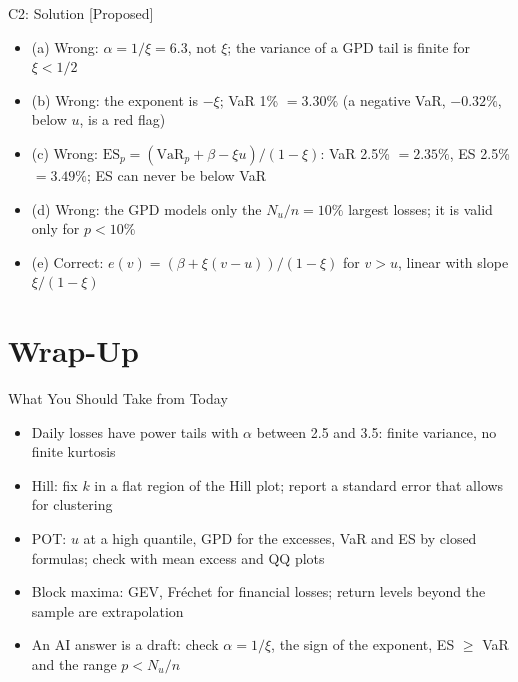 \ifsolutions
\begin{frame}{C2: Solution [Proposed]}
\itemsize{\footnotesize}
\begin{itemize}
    \item (a) Wrong: $\alpha = 1/\xi = 6.3$, not $\xi$; the variance of a GPD tail is finite for $\xi < 1/2$
    \item (b) Wrong: the exponent is $-\xi$; VaR 1\% $= 3.30\%$ (a negative VaR, $-0.32\%$, below $u$, is a red flag)
    \item (c) Wrong: $\mathrm{ES}_p = (\mathrm{VaR}_p + \beta - \xi u)/(1 - \xi)$: VaR 2.5\% $= 2.35\%$, ES 2.5\% $= 3.49\%$; ES can never be below VaR
    \item (d) Wrong: the GPD models only the $N_u/n = 10\%$ largest losses; it is valid only for $p < 10\%$
    \item (e) Correct: $e(v) = (\beta + \xi(v - u))/(1 - \xi)$ for $v > u$, linear with slope $\xi/(1 - \xi)$
\end{itemize}
\end{frame}
\fi


\section{Wrap-Up}

\begin{frame}{What You Should Take from Today}
\itemsize{\small}
\begin{itemize}
    \item Daily losses have power tails with $\alpha$ between 2.5 and 3.5: finite variance, no finite kurtosis
    \item Hill: fix $k$ in a flat region of the Hill plot; report a standard error that allows for clustering
    \item POT: $u$ at a high quantile, GPD for the excesses, VaR and ES by closed formulas; check with mean excess and QQ plots
    \item Block maxima: GEV, Fréchet for financial losses; return levels beyond the sample are extrapolation
    \item An AI answer is a draft: check $\alpha = 1/\xi$, the sign of the exponent, ES $\ge$ VaR and the range $p < N_u/n$
\end{itemize}
\end{frame}

